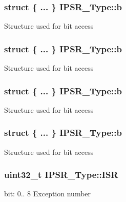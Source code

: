 \subsubsection[{\texorpdfstring{b}{b}}]{\setlength{\rightskip}{0pt plus 5cm}struct \{ ... \}   I\+P\+S\+R\+\_\+\+Type\+::b}\hypertarget{unionIPSR__Type_a1f47de00a39685db605e602ed90cbf97}{}\label{unionIPSR__Type_a1f47de00a39685db605e602ed90cbf97}
Structure used for bit access 
\subsubsection[{\texorpdfstring{b}{b}}]{\setlength{\rightskip}{0pt plus 5cm}struct \{ ... \}   I\+P\+S\+R\+\_\+\+Type\+::b}\hypertarget{unionIPSR__Type_afe1256bc03b84b5c0fdf602f26eb4707}{}\label{unionIPSR__Type_afe1256bc03b84b5c0fdf602f26eb4707}
Structure used for bit access 
\subsubsection[{\texorpdfstring{b}{b}}]{\setlength{\rightskip}{0pt plus 5cm}struct \{ ... \}   I\+P\+S\+R\+\_\+\+Type\+::b}\hypertarget{unionIPSR__Type_a2006d2ca6e88ca91ae1156fd750587de}{}\label{unionIPSR__Type_a2006d2ca6e88ca91ae1156fd750587de}
Structure used for bit access 
\subsubsection[{\texorpdfstring{b}{b}}]{\setlength{\rightskip}{0pt plus 5cm}struct \{ ... \}   I\+P\+S\+R\+\_\+\+Type\+::b}\hypertarget{unionIPSR__Type_a4a2c312576fbb5d252b50a5dbba48bcd}{}\label{unionIPSR__Type_a4a2c312576fbb5d252b50a5dbba48bcd}
Structure used for bit access 
\subsubsection[{\texorpdfstring{I\+SR}{ISR}}]{\setlength{\rightskip}{0pt plus 5cm}uint32\+\_\+t I\+P\+S\+R\+\_\+\+Type\+::\+I\+SR}\hypertarget{unionIPSR__Type_ab46e5f1b2f4d17cfb9aca4fffcbb2fa5}{}\label{unionIPSR__Type_ab46e5f1b2f4d17cfb9aca4fffcbb2fa5}
bit\+: 0.. 8 Exception number 
